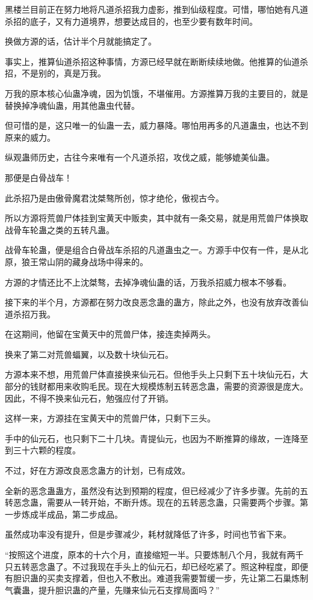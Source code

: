\begin{this_body}
黑楼兰目前正在努力地将凡道杀招我力虚影，推到仙级程度。可惜，哪怕她有凡道杀招的底子，又有力道境界，想要达成目的，也至少要有数年时间。

换做方源的话，估计半个月就能搞定了。

事实上，推算仙道杀招这种事情，方源已经早就在断断续续地做。他推算的仙道杀招，不是别的，真是万我。

万我的原本核心仙蛊净魂，因为饥饿，不堪催用。方源推算万我的主要目的，就是替换掉净魂仙蛊，用其他蛊虫代替。

但可惜的是，这只唯一的仙蛊一去，威力暴降。哪怕用再多的凡道蛊虫，也达不到原来的威力。

纵观蛊师历史，古往今来唯有一个凡道杀招，攻伐之威，能够媲美仙蛊。

那便是白骨战车！

此杀招乃是由傲骨魔君沈桀骜所创，惊才绝伦，傲视古今。

所以方源将荒兽尸体挂到宝黄天中贩卖，其中就有一条交易，就是用荒兽尸体换取战骨车轮蛊之类的五转凡蛊。

战骨车轮蛊，便是组合白骨战车杀招的凡道蛊虫之一。方源手中仅有一件，是从北原，狼王常山阴的藏身战场中得来的。

方源的才情还比不上沈桀骜，去掉净魂仙蛊的话，万我杀招威力根本不够看。

接下来的半个月，方源都在努力改良恶念蛊的蛊方，除此之外，也没有放弃改善仙道杀招万我。

在这期间，他留在宝黄天中的荒兽尸体，接连卖掉两头。

换来了第二对荒兽蝠翼，以及数十块仙元石。

方源本来不想，用荒兽尸体直接换来仙元石。但他手头上只剩下五十块仙元石，大部分的钱财都用来收购毛民。现在大规模炼制五转恶念蛊，需要的资源很是庞大。因此，不得不换来仙元石，勉强应付了开销。

这样一来，方源挂在宝黄天中的荒兽尸体，只剩下三头。

手中的仙元石，也只剩下二十几块。青提仙元，也因为不断推算的缘故，一连降至到三十六颗的程度。

不过，好在方源改良恶念蛊方的计划，已有成效。

全新的恶念蛊蛊方，虽然没有达到预期的程度，但已经减少了许多步骤。先前的五转恶念蛊，需要从一转开始，不断升炼。现在的五转恶念蛊，只需要两个步骤。第一步炼成半成品，第二步成品。

虽然成功率没有提升，但是步骤减少，耗材就降低了许多，时间也节省下来。

“按照这个进度，原本的十六个月，直接缩短一半。只要炼制八个月，我就有两千只五转恶念蛊了。不过我现在手头上的仙元石，却已经吃紧了。照这种程度，即便有胆识蛊的买卖支撑着，但也入不敷出。难道我需要暂缓一步，先让第二石巢炼制气囊蛊，提升胆识蛊的产量，先赚来仙元石支撑局面吗？”


\end{this_body}
